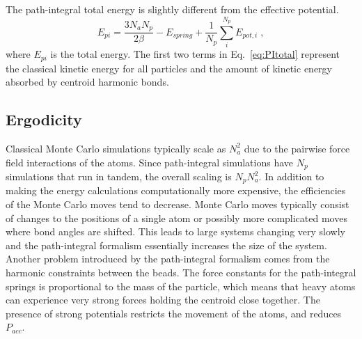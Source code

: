 \documentclass[12pt]{report}
\begin{document}
The path-integral total energy is slightly different from the effective
potential.
\begin{equation}
 \label{eq:PItotal}
 E_{pi} = \frac{3N_aN_p}{2\beta}-E_{spring}
          +\frac{1}{N_p}\sum_i^{N_p} E_{pot,i} \; ,
\end{equation}
where $E_{pi}$ is the total energy.
The first two terms in Eq.\ \ref{eq:PItotal} represent the classical kinetic
energy for all particles and the amount of kinetic energy absorbed by
centroid harmonic bonds.

\subsection{Ergodicity}

Classical Monte Carlo simulations typically scale as $N_a^2$ due to the
pairwise force field interactions of the atoms.
Since path-integral simulations have $N_p$ simulations that run in tandem,
the overall scaling is $N_pN_a^2$.
In addition to making the energy calculations computationally more expensive,
the efficiencies of the Monte Carlo moves tend to decrease.
Monte Carlo moves typically consist of changes to the positions of a single
atom or possibly more complicated moves where bond angles are shifted.
This leads to large systems changing very slowly and the path-integral
formalism essentially increases the size of the system. \\

Another problem introduced by the path-integral formalism comes from the
harmonic constraints between the beads.
The force constants for the path-integral springs is proportional to the mass
of the particle, which means that heavy atoms can experience very strong
forces holding the centroid close together.
The presence of strong potentials restricts the movement of the atoms, and
reduces $P_{acc}$.



\end{document}

